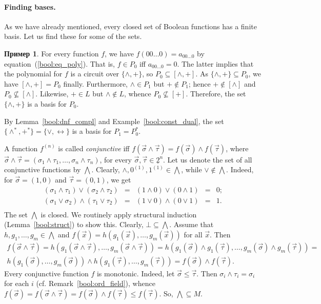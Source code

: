 \documentclass[12pt,notitlepage]{article}
\theoremstyle{plain}
\theoremstyle{definition}
\newtheorem{exm}[thm]{Пример}
\theoremstyle{plain}
\newcommand{\sbs}{\subseteq}
\newcommand{\ul}[1]{\underline{#1}}
\newcommand{\1}{\mathbf{1}}
\newcommand{\0}{\mathbf{0}}
\begin{document}
\paragraph{Finding bases.}
As we have already mentioned, every closed set of Boolean functions has a finite basis. Let us find these for some of the sets.

\begin{exm}
	For every function $f$, we have $f(00\ldots0) = a_{00\ldots0}$ by equation~(\ref{bool:eq_poly}). That is, $f \in P_0$ iff $a_{00\ldots0} = 0$. The latter implies that the polynomial for $f$ is a circuit over $\{{\wedge}, {+}\}$, so $P_0 \sbs [{\wedge}, {+}]$. As $\{{\wedge}, {+}\} \sbs P_0$, we have $[{\wedge}, {+}] = P_0$ finally. Furthermore, ${\wedge} \in P_1$ but ${+} \notin P_1$; hence ${+} \notin [{\wedge}]$ and $P_0 \not\sbs [{\wedge}]$. Likewise, ${+} \in L$ but ${\wedge} \notin L$, whence $P_0 \not\sbs [{+}]$. Therefore, the set $\{{\wedge}, {+}\}$ is a basis for $P_0$.
	
	By Lemma~\ref{bool:dnf_compl} and Example~\ref{bool:const_dual}, the set $\{{\wedge^*}, {+^*}\} = \{{\vee}, {\leftrightarrow}\}$ is a basis for $P_1 = P^*_0$.
\end{exm}

A function $f^{(n)}$ is called \emph{conjunctive} iff $f(\vec \sigma \wedge \vec\tau) = f(\vec\sigma) \wedge f(\vec\tau)$, where $\vec \sigma \wedge \vec\tau = (\sigma_1 \wedge \tau_1, \ldots, \sigma_n \wedge \tau_n)$, for every $\vec\sigma, \vec\tau \in \ul{2}^n$. Let us denote the set of all conjunctive functions by $\bigwedge$. Clearly, ${\wedge}, 0^{(1)}, 1^{(1)} \in {\bigwedge}$, while ${\vee} \notin {\bigwedge}$. Indeed, for $\vec \sigma = (1, 0)$ and $\vec \tau = (0, 1)$, we get
$$\begin{array}{rcccl}
	(\sigma_1 \wedge \tau_1) \vee (\sigma_2 \wedge \tau_2) &=& (1 \wedge 0) \vee (0 \wedge 1) &=& 0;\\
	(\sigma_1 \vee \sigma_2) \wedge (\tau_1 \vee \tau_2) &=& (1 \vee 0) \wedge (0 \vee 1) &=& 1.\\
\end{array}$$
The set $\bigwedge$ is closed. We routinely apply structural induction (Lemma~\ref{bool:struct}) to show this. Clearly, $\bot \sbs {\bigwedge}$. Assume that $h, g_1, \ldots,g_m \in {\bigwedge}$ and $f(\vec x) = h(g_1(\vec x),\ldots, g_m(\vec x))$ for all $\vec x$. Then
\begin{multline*}
	f(\vec \sigma \wedge \vec\tau) = h(g_1(\vec \sigma \wedge \vec\tau),\ldots, g_m(\vec \sigma \wedge \vec\tau)) =
	h(g_1(\vec\sigma) \wedge g_1(\vec\tau),\ldots,g_m(\vec\sigma) \wedge g_m(\vec\tau)) =\\
	h(g_1(\vec \sigma),\ldots, g_m(\vec \sigma)) \wedge h(g_1(\vec \tau),\ldots, g_m(\vec \tau)) = f(\vec\sigma) \wedge f(\vec\tau).
\end{multline*}
Every conjunctive function $f$ is monotonic. Indeed, let $\vec \sigma \leq \vec\tau$. Then $\sigma_i \wedge \tau_i = \sigma_i$ for each $i$ (cf. Remark~\ref{bool:ord_field}), whence $f(\vec \sigma) = f(\vec \sigma \wedge \vec\tau) = f(\vec\sigma) \wedge f(\vec\tau) \leq f(\vec{\tau})$. So, ${\bigwedge} \sbs M$.
\end{document}
